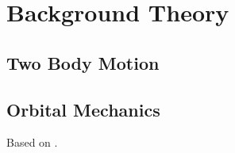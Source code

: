 
\section{Background Theory}


\subsection{Two Body Motion}


\subsection{Orbital Mechanics}

Based on \cite{Curtis2009}.

